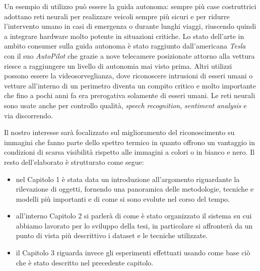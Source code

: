 Un esempio di utilizzo può essere la guida autonoma: sempre più case costruttrici adottano reti neurali
per realizzare veicoli sempre più sicuri e per ridurre l'intervento umano in casi di emergenza o durante lunghi viaggi, riuscendo quindi a integrare hardware molto potente in situazioni critiche. 
Lo stato dell'arte in ambito consumer sulla guida autonoma è stato raggiunto dall'americana \textit{Tesla} con il suo \textit{AutoPilot} che 
grazie a nove telecamere posizionate attorno alla vettura riesce a raggiungere un livello di autonomia mai visto prima.
Altri utilizzi possono essere la videosorveglianza, dove riconoscere intrusioni di esseri umani o vetture all'interno di un perimetro diventa un compito critico e molto importante che fino a pochi anni fa era prerogativa solamente di esseri umani. 
Le reti neurali sono usate anche per controllo qualità, \textit{speech recognition}, \textit{sentiment analysis} e via discorrendo. 


Il nostro interesse sarà focalizzato sul miglioramento del riconoscimento su immagini che fanno parte dello spettro termico in quanto offrono un vantaggio in condizioni di scarsa visibilità rispetto alle immagini a colori o in bianco e nero.
Il resto dell'elaborato è strutturato come segue:
\begin{itemize}
    \item nel Capitolo 1 è stata data un introduzione all'argomento riguardante la rilevazione di oggetti, fornendo una panoramica delle metodologie, tecniche e modelli più importanti e di come si sono evolute nel corso del tempo. 
    \item all'interno Capitolo 2 si parlerà di come è stato organizzato il sistema su cui abbiamo lavorato per lo sviluppo della tesi, in particolare si affronterà da un punto di vista più descrittivo i dataset e le tecniche utilizzate. 
    \item il Capitolo 3 riguarda invece gli esperimenti effettuati usando come base ciò che è stato descritto nel precedente capitolo. 
\end{itemize}